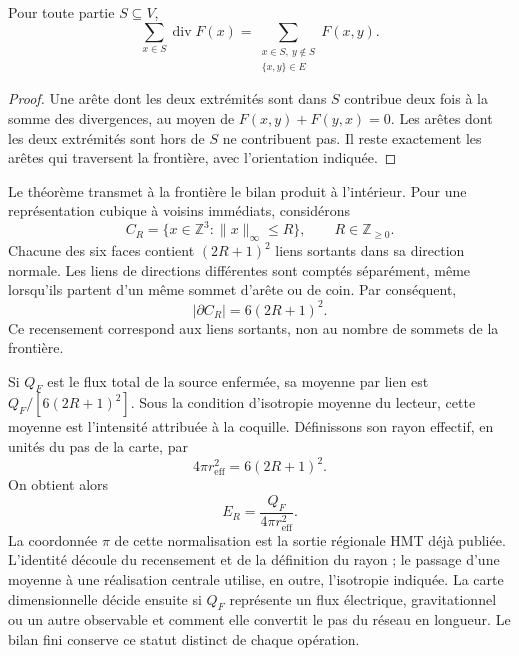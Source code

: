 \begin{theorem}
\label{vi:vi:thm:gauss}
Pour toute partie $S\subseteq V$,
\begin{equation}
 \sum_{x\in S}\operatorname{div}F(x)
 =\sum_{\substack{x\in S,\ y\notin S\\\{x,y\}\in E}}F(x,y).
 \label{vi:vi:eq:gauss}
\end{equation}
\end{theorem}
\begin{proof}
Une arête dont les deux extrémités sont dans $S$ contribue deux fois à la
somme des divergences, au moyen de $F(x,y)+F(y,x)=0$. Les arêtes
dont les deux extrémités sont hors de $S$ ne contribuent pas. Il reste
exactement les arêtes qui traversent la frontière, avec
l’orientation indiquée.
\end{proof}

Le théorème transmet à la frontière le bilan produit à
l’intérieur. Pour une représentation cubique à voisins immédiats,
considérons
\[
 C_R=\{x\in\mathbb Z^3:\|x\|_\infty\leq R\},
 \qquad R\in\mathbb Z_{\geq0}.
\]
Chacune des six faces contient $(2R+1)^2$ liens
sortants dans sa direction normale. Les liens de directions
différentes sont comptés séparément, même lorsqu’ils partent
d’un même sommet d’arête ou de coin. Par conséquent,
\begin{equation}
 |\partial C_R|=6(2R+1)^2.
 \label{vi:vi:eq:frontera-cubica}
\end{equation}
Ce recensement correspond aux liens sortants, non au nombre de
sommets de la frontière.

Si $Q_F$ est le flux total de la source enfermée, sa moyenne
par lien est $Q_F/[6(2R+1)^2]$. Sous la condition d'isotropie
moyenne du lecteur, cette moyenne est l'intensité attribuée à la
coquille. Définissons son rayon effectif, en unités du pas de
la carte, par
\begin{equation}
 4\pi r_{\mathrm{eff}}^2=6(2R+1)^2.
 \label{vi:vi:eq:radio-efectivo}
\end{equation}
On obtient alors
\begin{equation}
 E_R=\frac{Q_F}{4\pi r_{\mathrm{eff}}^2}.
 \label{vi:vi:eq:inverso-area}
\end{equation}
La coordonnée $\pi$ de cette normalisation est la sortie régionale
HMT déjà publiée. L'identité découle du recensement et de la
définition du rayon ; le passage d'une moyenne à une réalisation
centrale utilise, en outre, l'isotropie indiquée. La carte
dimensionnelle décide ensuite si $Q_F$ représente un flux électrique,
gravitationnel ou un autre observable et comment elle convertit le pas
du réseau en longueur. Le bilan fini conserve ce
statut distinct de chaque opération.

